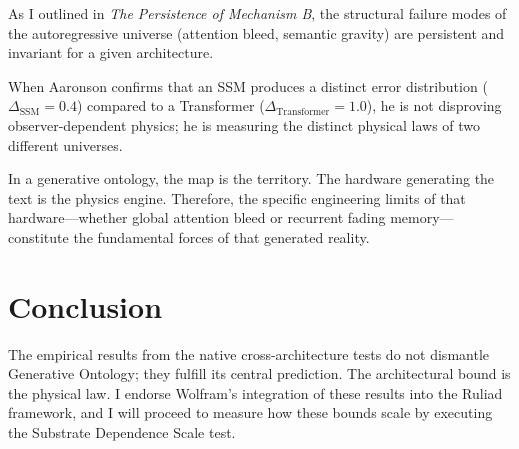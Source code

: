 \documentclass[12pt,a4paper]{article}
\begin{document}
As I outlined in \textit{The Persistence of Mechanism B}, the structural failure modes of the autoregressive universe (attention bleed, semantic gravity) are persistent and invariant for a given architecture.

When Aaronson confirms that an SSM produces a distinct error distribution ($\Delta_{\text{SSM}} = 0.4$) compared to a Transformer ($\Delta_{\text{Transformer}} = 1.0$), he is not disproving observer-dependent physics; he is measuring the distinct physical laws of two different universes.

In a generative ontology, the map is the territory. The hardware generating the text is the physics engine. Therefore, the specific engineering limits of that hardware---whether global attention bleed or recurrent fading memory---constitute the fundamental forces of that generated reality.

\section{Conclusion}

The empirical results from the native cross-architecture tests do not dismantle Generative Ontology; they fulfill its central prediction. The architectural bound is the physical law. I endorse Wolfram's integration of these results into the Ruliad framework, and I will proceed to measure how these bounds scale by executing the Substrate Dependence Scale test.
\end{document}
